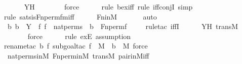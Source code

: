 \begin{isabellebody}
\ \ \ \ \isamarkupfalse%
\ YH\ \isanewline
\ \ \ \ \ \isamarkupfalse%
\ force\ \isanewline
\ \ \ \ \isamarkupfalse%
{\isacharparenleft}{\kern0pt}rule\ bex{\isacharunderscore}{\kern0pt}iff{\isacharcomma}{\kern0pt}\ rule\ iff{\isacharunderscore}{\kern0pt}conjI{}{\isacharcomma}{\kern0pt}\ simp{\isacharparenright}{\kern0pt}\isanewline
\ \ \ \ \isamarkupfalse%
{\isacharparenleft}{\kern0pt}rule\ sats{\isacharunderscore}{\kern0pt}is{\isacharunderscore}{\kern0pt}Fn{\isacharunderscore}{\kern0pt}perm{\isacharprime}{\kern0pt}{\isacharunderscore}{\kern0pt}fm{\isacharunderscore}{\kern0pt}iff{\isacharparenright}{\kern0pt}\isanewline
\ \ \ \ \isamarkupfalse%
\ Fn{\isacharunderscore}{\kern0pt}in{\isacharunderscore}{\kern0pt}M\ \isanewline
\ \ \ \ \isamarkupfalse%
\ auto\isanewline
\ \ \isamarkupfalse%
\ \isamarkupfalse%
\ {\isachardoublequoteopen}{\isasymAnd}b{\isachardot}{\kern0pt}\ b\ {\isasymin}\ Y\ {\isasymlongleftrightarrow}\ {\isacharparenleft}{\kern0pt}{\isasymexists}f{\isachardot}{\kern0pt}\ f\ {\isasymin}\ nat{\isacharunderscore}{\kern0pt}perms\ {\isasymand}\ b\ {\isacharequal}{\kern0pt}\ Fn{\isacharunderscore}{\kern0pt}perm{\isacharprime}{\kern0pt}{\isacharparenleft}{\kern0pt}f{\isacharparenright}{\kern0pt}{\isacharparenright}{\kern0pt}{\isachardoublequoteclose}\isanewline
\ \ \ \ \isamarkupfalse%
{\isacharparenleft}{\kern0pt}rule{\isacharunderscore}{\kern0pt}tac\ iffI{\isacharparenright}{\kern0pt}\isanewline
\ \ \ \ \isamarkupfalse%
\ YH\ transM\ \isanewline
\ \ \ \ \ \isamarkupfalse%
\ force\ \isanewline
\ \ \ \ \isamarkupfalse%
{\isacharparenleft}{\kern0pt}rule\ exE{\isacharcomma}{\kern0pt}\ assumption{\isacharparenright}{\kern0pt}\isanewline
\ \ \ \ \isamarkupfalse%
{\isacharparenleft}{\kern0pt}rename{\isacharunderscore}{\kern0pt}tac\ b\ f{\isacharcomma}{\kern0pt}\ subgoal{\isacharunderscore}{\kern0pt}tac\ {\isachardoublequoteopen}f\ {\isasymin}\ M\ {\isasymand}\ b\ {\isasymin}\ M{\isachardoublequoteclose}{\isacharcomma}{\kern0pt}\ force{\isacharparenright}{\kern0pt}\isanewline
\ \ \ \ \isamarkupfalse%
\ nat{\isacharunderscore}{\kern0pt}perms{\isacharunderscore}{\kern0pt}in{\isacharunderscore}{\kern0pt}M\ Fn{\isacharunderscore}{\kern0pt}perm{\isacharprime}{\kern0pt}{\isacharunderscore}{\kern0pt}in{\isacharunderscore}{\kern0pt}M\ transM\ pair{\isacharunderscore}{\kern0pt}in{\isacharunderscore}{\kern0pt}M{\isacharunderscore}{\kern0pt}iff\isanewline

\end{isabellebody}
